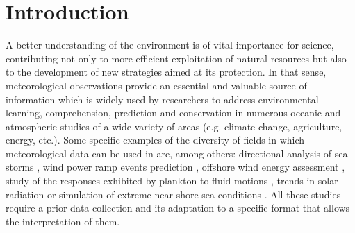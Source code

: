 \documentclass[review]{elsarticle}
\begin{document}
	\linenumbers

	\section{Introduction}
		
		A better understanding of the environment is of vital importance for science, contributing not only to more efficient exploitation of natural resources but also to the development of new strategies aimed at its protection. In that sense, meteorological observations provide an essential and valuable source of information which is widely used by researchers to address environmental learning, comprehension, prediction and conservation in numerous oceanic and atmospheric studies of a wide variety of areas (e.g. climate change, agriculture, energy, etc.). Some specific examples of the diversity of fields in which meteorological data can be used in are, among others: directional analysis of sea storms \cite{LAFACE201545}, wind power ramp events prediction \cite{DORADOMORENO2017428}, offshore wind energy assessment \cite{DVORAK20101244}, study of the responses exhibited by plankton to fluid motions \cite{FUCHS2016109}, trends in solar radiation \cite{SILVA20101852} or simulation of extreme near shore sea conditions \cite{GOULDBY201415}. All these studies require a prior data collection and its adaptation to a specific format that allows the interpretation of them.
		
\end{document}
